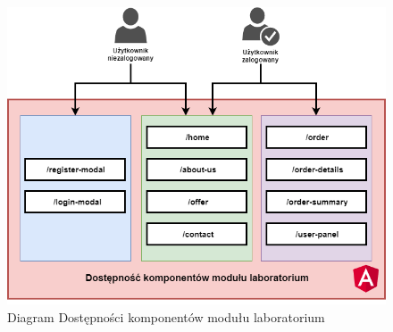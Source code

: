 \begin{figure}[ht]
	\centering
	\includegraphics[width=0.8\linewidth]{graphics/chapter-4/lab-module-availability.png}
	\caption{Diagram Dostępności komponentów modułu laboratorium}
	\label{fig:lab-module-availabelity}
\end{figure}


